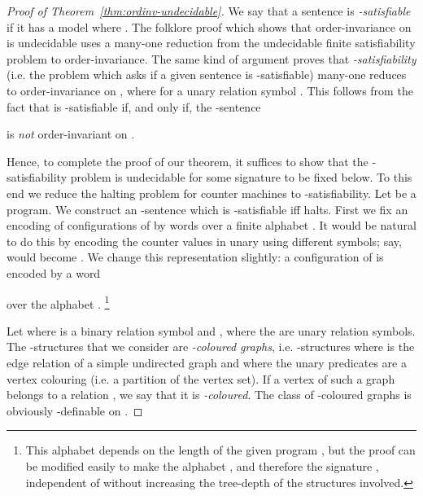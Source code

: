 \documentclass[11pt]{article}
\begin{document}
\begin{proof}[Proof of Theorem~\ref{thm:ordinv-undecidable}]
  We say that a sentence  is
  \emph{-satisfiable} if it has a model  where
  .  The folklore proof which shows that
  order-invariance on  is undecidable uses a many-one
  reduction from the undecidable finite satisfiability problem to
  order-invariance.  The same kind of argument proves that
  \emph{-satisfiability} (i.e. the problem which asks if a given
  sentence  is -satisfiable) many-one
  reduces to order-invariance on , where  for a unary relation symbol .
  This follows from the fact that  is
  -satisfiable if, and only if, the -sentence
  
  is \emph{not} order-invariant on .

  Hence, to complete the proof of our theorem, it suffices to show
  that the -satisfiability problem is undecidable for some
  signature  to be fixed below. To this end we reduce the
  halting problem for counter machines to -satisfiability.  Let
   be a program. We construct an
  -sentence  which is
  -satisfiable iff  halts.  First we fix an
  encoding of configurations of  by words over a finite alphabet
  . It would be natural to do this by encoding the counter values
  in unary using different symbols; say,  would become
  . We change this representation
  slightly: a configuration  of  is encoded by a word
  
  over the alphabet .
  \footnote{This alphabet depends on the length of
    the given program , but the proof can be
    modified easily to make the alphabet , and therefore the signature , independent of  without increasing the tree-depth of the structures involved.}

  Let  where  is a binary relation
  symbol and , where the  are
  unary relation symbols.  The -structures that we consider
  are \emph{-coloured graphs}, i.e. -structures where
   is the edge relation of a simple undirected graph and where the
  unary predicates are a vertex colouring (i.e. a partition of the
  vertex set). If a vertex of such a graph belongs to a relation
  , we say that it is \emph{-coloured}. The class of
  -coloured graphs is obviously -definable on
  .


\end{proof}
\end{document}
